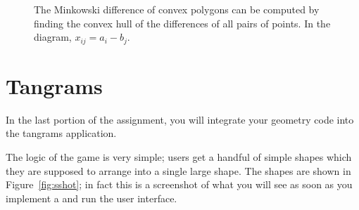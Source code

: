 \documentclass{pset}
\begin{document}
\begin{figure}
\begin{center}
\end{center}
\caption{The Minkowski difference of convex polygons can be computed by finding
the convex hull of the differences of all pairs of points.  In the diagram,
$x_{ij} = a_i - b_j$.}
\label{fig:mink}
\end{figure}

\part{Tangrams}

In the last portion of the assignment, you will integrate your geometry code
into the tangrams application.

The logic of the game is very simple; users get a handful of simple shapes
which they are supposed to arrange into a single large shape.  The shapes are
shown in Figure~\ref{fig:sshot}; in fact this is a screenshot of what you will
see as soon as you implement a  and run the user interface.
\end{document}

